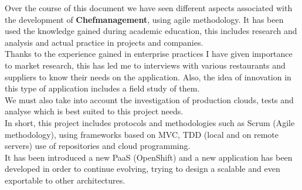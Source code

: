 

Over the course of this document we have seen different aspects associated with the development of \textbf{Chefmanagement}, using agile methodology. It has been used the knowledge gained during academic education, this includes research and analysis and actual practice in projects and companies. \\

Thanks to the experience gained in enterprise practices I have given importance to market research, this has led me to interviews with various restaurants and suppliers to know their needs on the application. Also, the idea of innovation in this type of application includes a field study of them. \\

We must also take into account the investigation of production clouds, tests and analyse which is best suited to this project needs. \\

In short, this project includes protocols and methodologies such as Scrum (Agile methodology), using frameworks based on MVC, TDD (local and on remote servers) use of repositories and cloud programming. \\

It has been introduced a new PaaS (OpenShift) and a new application has been developed in order to continue evolving, trying to design a scalable and even exportable to other architectures.